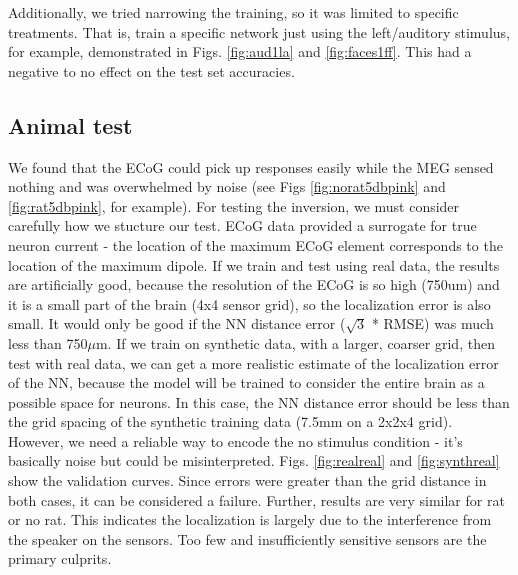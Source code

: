 \documentclass[journal,12pt,onecolumn,draftclsnofoot]{IEEEtran}
\begin{document}
Additionally, we tried narrowing the training, so it was limited to specific treatments. That is, train a specific network just using the left/auditory stimulus, for example, demonstrated in Figs. \ref{fig:aud1la} and \ref{fig:faces1ff}. This had a negative to no effect on the test set accuracies.

\subsection{Animal test}

We found that the ECoG could pick up responses easily while the MEG sensed nothing and was overwhelmed by noise (see Figs \ref{fig:norat5dbpink} and \ref{fig:rat5dbpink}, for example). For testing the inversion, we must consider carefully how we stucture our test. ECoG data provided a surrogate for true neuron current - the location of the maximum ECoG element corresponds to the location of the maximum dipole. If we train and test using real data, the results are artificially good, because the resolution of the ECoG is so high (750um) and it is a small part of the brain (4x4 sensor grid), so the localization error is also small. It would only be good if the NN distance error ($\sqrt{3}$ * RMSE) was much less than 750$\mu$m. If we train on synthetic data, with a larger, coarser grid, then test with real data, we can get a more realistic estimate of the localization error of the NN, because the model will be trained to consider the entire brain as a possible space for neurons. In this case, the NN distance error should be less than the grid spacing of the synthetic training data (7.5mm on a 2x2x4 grid). However, we need a reliable way to encode the no stimulus condition - it’s basically noise but could be misinterpreted. Figs. \ref{fig:realreal} and \ref{fig:synthreal} show the validation curves. Since errors were greater than the grid distance in both cases, it can be considered a failure. Further, results are very similar for rat or no rat. This indicates the localization is largely due to the interference from the speaker on the sensors. Too few and insufficiently sensitive sensors are the primary culprits.
\end{document}
